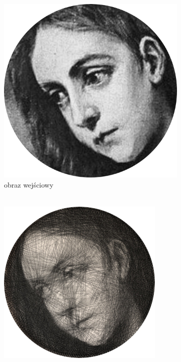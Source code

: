     	\begin{figure}[H] 
        \centering
        \begin{subfigure}{0.31\textwidth}
            \centering
            \includegraphics[width = \textwidth]{img/6-comp/magdalene_original_c10_inv0.png}
            \caption{obraz wejściowy\\\hphantom{ }\\\hphantom{ }}
            \label{comp-comp-magdalene-a}
        \end{subfigure}
        \begin{subfigure}{0.31\textwidth}
            \centering
            \includegraphics[width = \textwidth]{img/6-comp/magdalene_petros_.jpg}

\end{subfigure}
\end{figure}
